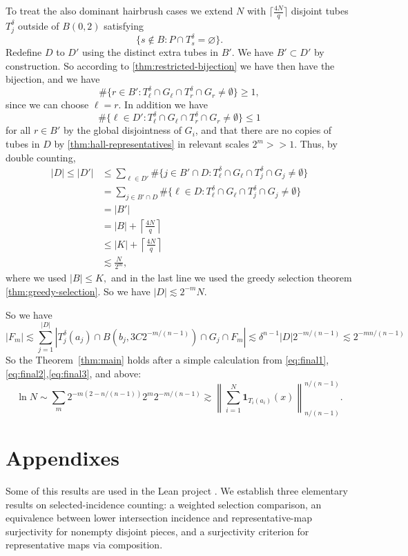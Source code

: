 \documentclass[11pt, letterpaper]{nyjm}
\begin{document}
	To treat the also dominant hairbrush cases we extend
	$N$ with $\lceil \frac{4N}{q} \rceil$  disjoint tubes $T_j^{\delta}$ outside of $B(0,2)$ satisfying 
	\[
	\{s\notin B:P\cap T_s^\delta=\varnothing\}. \]  
	Redefine $D$ to $D'$ using the distinct extra tubes in $B'$.
	We have $B' \subset D'$ by construction.
	So according to \ref{thm:restricted-bijection} we have 
	then have the bijection, and we have
	\[
	\#\{r\in B' :T_{\ell}^{\delta} \cap  G_{\ell} \cap T_r^{\delta} \cap G_{r} \neq \emptyset\} \geq 1, 
	\]
	since we can choose $\ell = r.$
	In addition we have 
	\[
	\#\{\ell \in D':T_{\ell}^{\delta} \cap G_{\ell} \cap T_{r}^{\delta} \cap G_{r}\neq \emptyset\} \leq 1
	\] for all $r \in B'$ by the global disjointness of $G_{i}$, and that there are no copies of tubes in $D$ by \ref{thm:hall-representatives} in relevant scales $2^m >> 1.$  
	Thus, by double counting,
	\[
	\begin{aligned}
		|D| \leq |D'|
		&\leq \sum_{\ell\in D'}
		\#\{j\in B' \cap D :T_{\ell}^{\delta} \cap G_{\ell} \cap T_j^{\delta} \cap G_{j} \neq \emptyset\} \\
		&=
		\sum_{j \in B' \cap D}
		\#\{\ell \in D:T_{\ell}^{\delta} \cap G_{\ell} \cap T_{j}^{\delta} \cap G_j \neq \emptyset\} \\
		&= |B'| \\
		&= |B| + \left\lceil \frac{4N}{q} \right \rceil \\
		&\leq |K| + \left \lceil \frac{4N}{q} \right\rceil\\
		&\lesssim \frac{N}{2^m},
	\end{aligned}
	\]
	where we used $|B| \leq K,$ and 
	in the last line we used the greedy selection theorem \ref{thm:greedy-selection}. 
	So we have $|D| \lesssim 2^{-m}N.$
	
	So we have 
	\begin{equation}
		|F_m| \lesssim \sum_ {j=1}^{|D|}|T^\delta_j(a_j) \cap B(b_{j},3C2^{-m/(n-1)}) \cap G_j \cap F_m| \lesssim \delta^{n-1}|D|2^{-m/(n-1)} \lesssim 2^{-mn/(n-1)} 
	\end{equation}
	So the Theorem~\ref{thm:main} holds after a simple calculation from \eqref{eq:final1}, \eqref{eq:final2},\eqref{eq:final3}, and above:
	\[
	\ln N \sim \sum_m 2^{-m(2-n/(n-1))} 2^{m}2^{-m/(n-1)}
	\gtrsim \left\| \sum_{i=1}^{N} \mathbf{1}_{T_i(a_i)}(x)
	\right\|_{n/(n-1)}^{n/(n-1)}.
	\] 
	
	\section{Appendixes}
	\appendix
	Some of this results are used in the Lean project \cite{Aspegren2026Lean}.
	We establish three elementary results on selected-incidence counting: a weighted selection comparison, an equivalence between lower intersection incidence and representative-map surjectivity for nonempty disjoint pieces, and a surjectivity criterion for representative maps via composition. 
	
\end{document}
